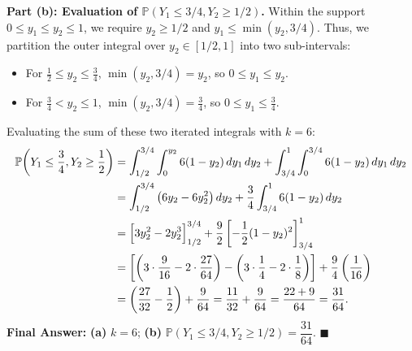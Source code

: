 \documentclass[11pt, letterpaper]{article}
\theoremstyle{definition}
\theoremstyle{remark}
\begin{document}
\textbf{Part (b): Evaluation of $\mathbb{P}(Y_1 \le 3/4, Y_2 \ge 1/2)$.}
Within the support $0 \le y_1 \le y_2 \le 1$, we require $y_2 \ge 1/2$ and $y_1 \le \min(y_2, 3/4)$. Thus, we partition the outer integral over $y_2 \in [1/2, 1]$ into two sub-intervals:
\begin{itemize}
    \item For $\frac{1}{2} \le y_2 \le \frac{3}{4}$, $\min(y_2, 3/4) = y_2$, so $0 \le y_1 \le y_2$.
    \item For $\frac{3}{4} < y_2 \le 1$, $\min(y_2, 3/4) = \frac{3}{4}$, so $0 \le y_1 \le \frac{3}{4}$.
\end{itemize}
Evaluating the sum of these two iterated integrals with $k = 6$:
\begin{align*}
    \mathbb{P}\!\left(Y_1 \le \frac{3}{4}, Y_2 \ge \frac{1}{2}\right) 
    &= \int_{1/2}^{3/4} \int_{0}^{y_2} 6(1 - y_2) \, dy_1 \, dy_2 + \int_{3/4}^{1} \int_{0}^{3/4} 6(1 - y_2) \, dy_1 \, dy_2 \\
    &= \int_{1/2}^{3/4} \left( 6y_2 - 6y_2^2 \right) dy_2 + \frac{3}{4} \int_{3/4}^{1} 6(1 - y_2) \, dy_2 \\
    &= \Bigl[ 3y_2^2 - 2y_2^3 \Bigr]_{1/2}^{3/4} + \frac{9}{2} \left[ -\frac{1}{2}(1 - y_2)^2 \right]_{3/4}^{1} \\
    &= \left[ \left( 3 \cdot \frac{9}{16} - 2 \cdot \frac{27}{64} \right) - \left( 3 \cdot \frac{1}{4} - 2 \cdot \frac{1}{8} \right) \right] + \frac{9}{4} \left( \frac{1}{16} \right) \\
    &= \left( \frac{27}{32} - \frac{1}{2} \right) + \frac{9}{64} = \frac{11}{32} + \frac{9}{64} = \frac{22 + 9}{64} = \frac{31}{64}.
\end{align*}
\textbf{Final Answer:} \textbf{(a)} $k = 6$; \quad \textbf{(b)} $\mathbb{P}(Y_1 \le 3/4, Y_2 \ge 1/2) = \dfrac{31}{64}$. $\blacksquare$

\bigskip
\end{document}
